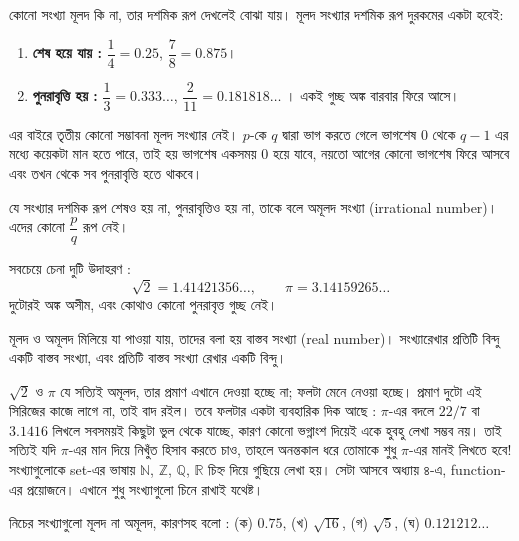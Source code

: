 \documentclass[11pt]{article}
\begin{document}
\begin{idea}
কোনো সংখ্যা মূলদ কি না, তার দশমিক রূপ দেখলেই বোঝা যায়। মূলদ সংখ্যার দশমিক রূপ
দুরকমের একটা হবেই:

\begin{enumerate}
  \item \textbf{শেষ হয়ে যায় :} $\dfrac{1}{4} = 0.25$, \; $\dfrac{7}{8} = 0.875$।
  \item \textbf{পুনরাবৃত্তি হয় :} $\dfrac{1}{3} = 0.333\ldots$, \;
        $\dfrac{2}{11} = 0.181818\ldots$ । একই গুচ্ছ অঙ্ক বারবার ফিরে আসে।
\end{enumerate}

\noindent
এর বাইরে তৃতীয় কোনো সম্ভাবনা মূলদ সংখ্যার নেই। $p$-কে $q$ দ্বারা ভাগ করতে গেলে ভাগশেষ
$0$ থেকে $q-1$ এর মধ্যে কয়েকটা মান হতে  পারে, তাই হয় ভাগশেষ একসময়
$0$ হয়ে যাবে, নয়তো আগের কোনো ভাগশেষ ফিরে আসবে এবং তখন থেকে সব পুনরাবৃত্তি
হতে থাকবে।
\end{idea}

\begin{idea}[অমূলদ সংখ্যা]
যে সংখ্যার দশমিক রূপ শেষও হয় না, পুনরাবৃত্তিও হয় না, তাকে বলে অমূলদ সংখ্যা
(irrational number)। এদের কোনো $\dfrac{p}{q}$ রূপ নেই।

সবচেয়ে চেনা দুটি উদাহরণ :
\[
  \sqrt{2} = 1.41421356\ldots, \qquad \pi = 3.14159265\ldots
\]
দুটোরই অঙ্ক অসীম, এবং কোথাও কোনো পুনরাবৃত্ত গুচ্ছ নেই।

মূলদ ও অমূলদ মিলিয়ে যা পাওয়া যায়, তাদের বলা হয় বাস্তব সংখ্যা (real number)।
সংখ্যারেখার প্রতিটি বিন্দু একটি বাস্তব সংখ্যা, এবং প্রতিটি বাস্তব সংখ্যা
রেখার একটি বিন্দু।
\end{idea}

\begin{remark}
$\sqrt{2}$ ও $\pi$ যে সত্যিই অমূলদ, তার প্রমাণ এখানে দেওয়া হচ্ছে না; ফলটা
মেনে নেওয়া হচ্ছে। প্রমাণ দুটো এই সিরিজের কাজে লাগে না, তাই বাদ রইল। তবে ফলটার
একটা ব্যবহারিক দিক আছে : $\pi$-এর বদলে $22/7$ বা $3.1416$ লিখলে সবসময়ই কিছুটা
ভুল থেকে যাচ্ছে, কারণ কোনো ভগ্নাংশ দিয়েই একে হুবহু লেখা সম্ভব নয়। তাই সত্যিই যদি $\pi$-এর মান দিয়ে নিখুঁত হিসাব করতে চাও, তাহলে অনন্তকাল ধরে তোমাকে শুধু $\pi$-এর মানই লিখতে হবে!\newline
সংখ্যাগুলোকে set-এর ভাষায় $\mathbb{N}$, $\mathbb{Z}$, $\mathbb{Q}$,
$\mathbb{R}$ চিহ্ন দিয়ে গুছিয়ে লেখা হয়। সেটা আসবে অধ্যায় ৪-এ, function-এর
প্রয়োজনে। এখানে শুধু সংখ্যাগুলো চিনে রাখাই যথেষ্ট।
\end{remark}

\begin{example}
নিচের সংখ্যাগুলো মূলদ না অমূলদ, কারণসহ বলো :
(ক) $0.75$, \; (খ) $\sqrt{16}$, \; (গ) $\sqrt{5}$, \; (ঘ) $0.121212\ldots$
\end{example}
\end{document}
